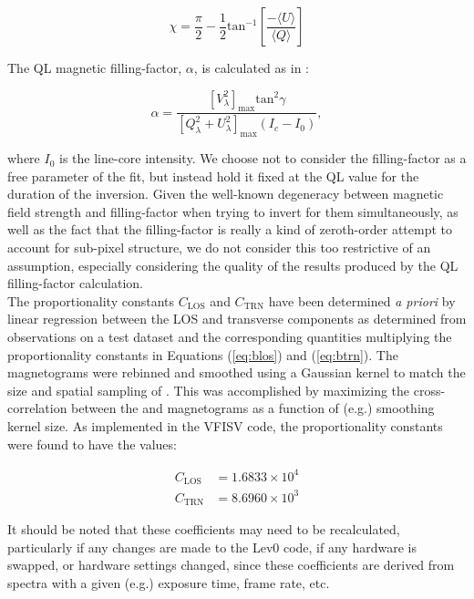 \documentclass[11pt]{article}
\begin{document}
\begin{equation}
\chi = \frac{\pi}{2} - \frac{1}{2}\mathrm{tan}^{-1}\left[\frac{-{\langle U \rangle}}{{\langle Q \rangle}}\right]
\end{equation}

The QL magnetic filling-factor, $\alpha$, is calculated as in \citet{bommier:2009}:

\begin{equation}
\alpha = \frac{ \left[V_{\lambda}^{2}\right]_{\mathrm{max}}\mathrm{tan}^{2}\gamma}
              {\left[Q_{\lambda}^{2} + U_{\lambda}^{2}\right]_{\mathrm{max}}\left(I_{c}-I_{0}\right)},
\end{equation}

where $I_{0}$ is the line-core intensity.  We choose not to consider the filling-factor as a free
parameter of the fit, but instead hold it fixed at the QL value for the duration of the inversion.
Given the well-known degeneracy between magnetic field strength and filling-factor when trying to 
invert for them simultaneously, as well as the fact that the filling-factor is really a kind of zeroth-order
attempt to account for sub-pixel structure, we do not consider this too restrictive
of an assumption, especially considering the quality of the results produced by the QL filling-factor
calculation.\\

The proportionality constants $C_{\mathrm{LOS}}$ and $C_{\mathrm{TRN}}$ have been determined
\textit{a priori} by linear regression between the LOS and transverse components as determined
from \sdohmi observations on a test dataset and the corresponding quantities multiplying the 
proportionality constants in Equations (\ref{eq:blos}) and (\ref{eq:btrn}).  The \sdohmi magnetograms
were rebinned and smoothed using a Gaussian kernel to match the size and spatial sampling of \solisvsm.
This was accomplished by maximizing the cross-correlation between the \solisvsm and \sdohmi magnetograms
as a function of (e.g.) smoothing kernel size.  As implemented in the VFISV code, the proportionality
constants were found to have the values:

\begin{align}
C_{\mathrm{LOS}} &= 1.6833 \times 10^{4}\\
C_{\mathrm{TRN}} &= 8.6960 \times 10^{3}
\end{align}

It should be noted that these coefficients may need to be recalculated, particularly if any
changes are made to the Lev0 code, if any hardware is swapped, or hardware settings changed,
since these coefficients are derived from spectra with a given (e.g.) exposure time, frame
rate, etc.\\
\end{document}
